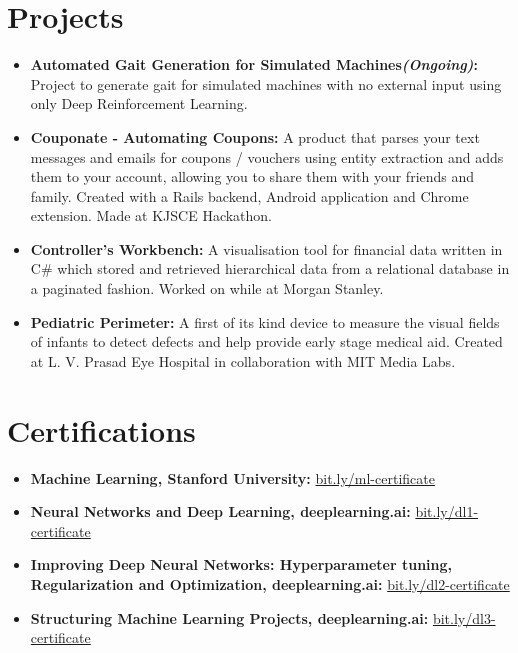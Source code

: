 \documentclass[letterpaper,8pt]{article}
\newcommand{\resumeSubHeadingListStart}{\begin{itemize}[leftmargin=*]}
\newcommand{\resumeSubHeadingListEnd}{\end{itemize}}
\begin{document}
\section{Projects}
  \resumeSubHeadingListStart
    \item{
      \textbf{Automated Gait Generation for Simulated Machines{\em (Ongoing)}:}{ Project to generate gait for simulated machines with no external input using only Deep Reinforcement Learning.}
      \hfill
    }
    \vspace{-4pt}
    \item{
      \textbf{Couponate - Automating Coupons:}{ A product that parses your text messages and emails for coupons / vouchers using entity extraction and adds them to your account, allowing you to share them with your friends and family. Created with a Rails backend, Android application and Chrome extension. Made at KJSCE Hackathon.}
      \hfill
    }
    \vspace{-4pt}
    \item{
      \textbf{Controller's Workbench:}{ A visualisation tool for financial data written in C\# which stored and retrieved hierarchical data from a relational database in a paginated fashion. Worked on while at Morgan Stanley.}
      \hfill
    }
    \vspace{-4pt}
    \item{
      \textbf{Pediatric Perimeter:}{ A first of its kind device to measure the visual fields of infants to detect defects and help provide early stage medical aid. Created at L. V. Prasad Eye Hospital in collaboration with MIT Media Labs.}
      \hfill
    }
  \resumeSubHeadingListEnd
\section{Certifications}
  \resumeSubHeadingListStart
    \item{
      \textbf{Machine Learning, Stanford University:}{ \href{http://bit.ly/ml-certificate}{bit.ly/ml-certificate}}
      \hfill
    }
    \vspace{-4pt}
    \item{
      \textbf{Neural Networks and Deep Learning, deeplearning.ai:}{ \href{http://bit.ly/dl1-certificate}{bit.ly/dl1-certificate}}
      \hfill
    }
    \vspace{-4pt}
    \item{
      \textbf{Improving Deep Neural Networks: Hyperparameter tuning, Regularization and Optimization, deeplearning.ai:}{ \href{http://bit.ly/dl2-certificate}{bit.ly/dl2-certificate}}
      \hfill
    }
    \vspace{-4pt}
    \item{
      \textbf{Structuring Machine Learning Projects, deeplearning.ai:}{ \href{http://bit.ly/dl3-certificate}{bit.ly/dl3-certificate}}
      \hfill
    }
  \resumeSubHeadingListEnd
\end{document}
